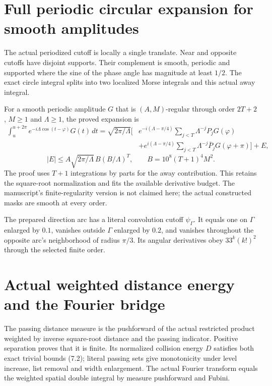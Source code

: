 \documentclass[11pt]{article}
\begin{document}
\newpage
\section*{Full periodic circular expansion for smooth amplitudes}
The actual periodized cutoff is locally a single translate. Near and opposite
cutoffs have disjoint supports. Their complement is smooth, periodic and
supported where the sine of the phase angle has magnitude at least $1/2$.
The exact circle integral splits into two localized Morse integrals and this
actual away integral.

For a smooth periodic amplitude $G$ that is $(A,M)$-regular through order $2T+2$,
$M\ge1$ and $\Lambda\ge1$, the proved expansion is
\[
\begin{split}
\int_u^{u+2\pi}e^{-i\Lambda\cos(t-\varphi)}G(t)\,dt
=\sqrt{2\pi/\Lambda}\bigg[&
 e^{-i(\Lambda-\pi/4)}\sum_{j<T}\Lambda^{-j}P_jG(\varphi)\\
 &+e^{i(\Lambda-\pi/4)}\sum_{j<T}\Lambda^{-j}\bar P_jG(\varphi+\pi)\bigg]+E,
\end{split}
\]
\[
|E|\le A\sqrt{2\pi/\Lambda}\,B(B/\Lambda)^T,
\qquad B=10^8(T+1)^4M^2.
\]
The proof uses $T+1$ integrations by parts for the away contribution. This
retains the square-root normalization and fits the available derivative
budget. The manuscript's finite-regularity version is not claimed here;
the actual constructed masks are smooth at every order.

The prepared direction arc has a literal convolution cutoff $\psi_\Gamma$.
It equals one on $\Gamma$ enlarged by $0.1$, vanishes outside $\Gamma$ enlarged
by $0.2$, and vanishes throughout the opposite arc's neighborhood of radius
$\pi/3$. Its angular derivatives obey $33^k(k!)^2$ through the selected finite order.

\newpage
\section*{Actual weighted distance energy and the Fourier bridge}
The passing distance measure is the pushforward of the actual restricted
product weighted by inverse square-root distance and the passing indicator.
Positive separation proves that it is finite. Its normalized collision energy
$D$ satisfies both exact trivial bounds (7.2); literal passing sets give
monotonicity under level increase, list removal and width enlargement.
The actual Fourier transform equals the weighted spatial double integral by
measure pushforward and Fubini.
\end{document}
